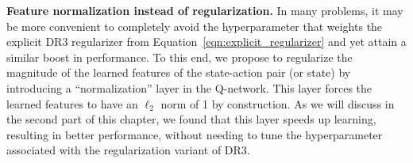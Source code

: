 \textbf{Feature normalization instead of regularization.} In many problems, it may be more convenient to completely avoid the hyperparameter that weights the explicit DR3 regularizer from Equation~\ref{eqn:explicit_regularizer} and yet attain a similar boost in performance. To this end, we propose to regularize the magnitude of the learned features of the state-action pair (or state) by introducing a ``normalization'' layer in the Q-network. This layer forces the learned features to have an $\ell_2$ norm of 1 by construction. As we will discuss in the second part of this chapter, we found that this layer speeds up learning, resulting in better performance, without needing to tune the hyperparameter associated with the regularization variant of DR3.    





